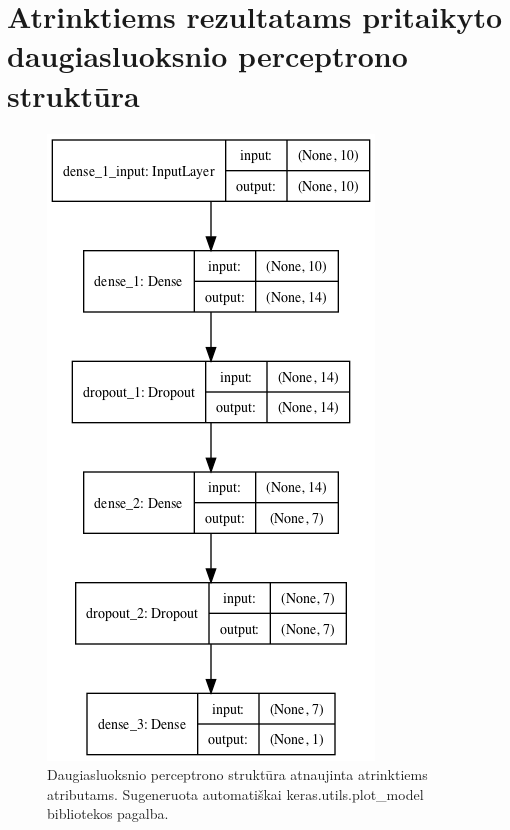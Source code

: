 \documentclass{VUMIFPSbakalaurinis}
\begin{document}
\section{Atrinktiems rezultatams pritaikyto daugiasluoksnio perceptrono struktūra}
\begin{figure}[H]
    \centering
    \includegraphics[scale=0.9]{img/model_adjusted}
    \caption{Daugiasluoksnio perceptrono struktūra atnaujinta atrinktiems atributams. Sugeneruota automatiškai keras.utils.plot\_model bibliotekos pagalba.}
    \label{img:model_adj}
\end{figure}
\end{document}
